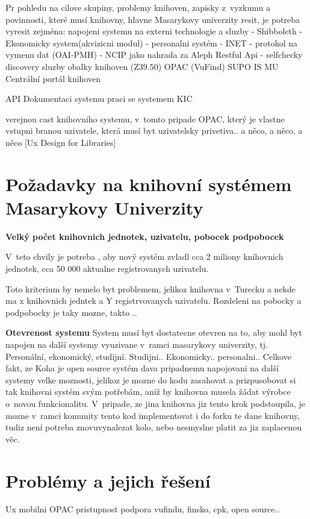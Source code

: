 \documentclass[
	12pt, oneside, printed, final, 
	table,   %
	lof,     %
	lot     %
]{fithesis3}
\begin{document}
{Pr pohledu na cilove skupiny, problemy knihoven, zapisky z~vyzkumu a povinnosti, které musí knihovny, hlavne Masarykovy univerzity resit, je potreba vyresit zejména:
napojeni systemu na externi technologie a sluzby 
- Shibboleth
- Ekonomicky system(akvizicni modul)
- personalni systém
- INET
- protokol na vymenu dat (OAI-PMH)
- NCIP jako nahrada za Aleph Restful Api
- selfchecky
discovery sluzby
obalky knihoven (Z39.50)
OPAC (VuFind)
SUPO
IS MU
Centrální portál knihoven

API 
Dokumentaci systemu
praci se systemem
KIC

verejnou cast knihovniho systemu, v~tomto pripade OPAC, který je vlastne vstupni branou uzivatele, která musí byt uzivatelsky privetiva.. a něco, a něco, a něco [Ux Design for Libraries]

\section{Požadavky na knihovní systémem Masarykovy Univerzity}
\textbf{Velký počet knihovnich jednotek, uzivatelu, pobocek podpobocek}\newline

V~teto chvily je potreba , aby nový systém zvladl cca 2 miliony knihovnich jednotek, cca 50 000 aktualne registrovanych  uzivatelu.

Toto kriterium by nemelo byt problemem, jelikoz knihovna v~Turecku a nekde ma x knihovnich jedntek a Y registrvovanych uzivatelu. 
Rozdeleni na pobocky a podpobocky je taky mozne, takto ..\newline\newline

\textbf{Otevrenost systemu}\newline
System musí byt dostatecne otevren na to, aby mohl byt napojen na další systemy vyuzivane v~ramci masarykovy univerzity, tj. Personální, ekonomický, studijní.
Studijni..
Ekonomicky..
personalni..
Celkove fakt, ze Koha je open source systém dava pripadnemu napojovani na další systemy velke moznosti, jelikoz je mozne do kodu zasahovat a prizpusobovat si tak knihovni systém svým potřebám, aniž by knihovna musela žádat výrobce o~novou funkcionalitu.
V~pripade, ze jina knihovna jiz tento krok podstoupila, je mozne v~ramci komunity tento kod  implementovat i do forku te dane knihovny, tudiz není potreba  znovuvynalezat kolo, nebo nesmyslne platit za jiz zaplacenou věc.

\section{Problémy a jejich řešení}
Ux
mobilni OPAC
pristupnost
podpora vufindu, finsko, cpk, open source..

}
\end{document}
